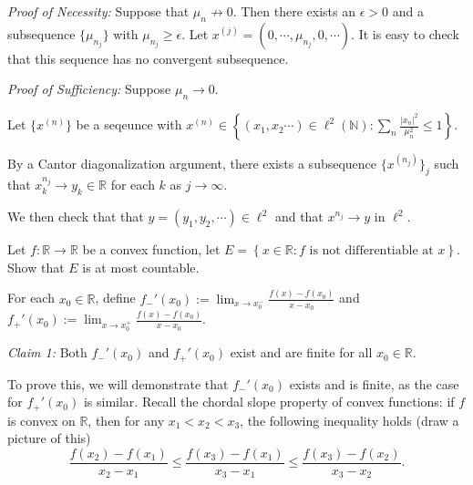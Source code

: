 \documentclass{exam}
\theoremstyle{problemstyle}
\newcommand{\vt}{\vskip 5mm} %
\newcommand{\1}[1]{\textbf{1}_{\left[#1\right]}} %
\def\R{\mathbb{R}} %
\begin{document}
\begin{questions}
\begin{parts}
\begin{solution}
\vt
\textit{Proof of Necessity:} Suppose that $\mu_n\not\to 0$. Then there exists an $\epsilon>0$ and a subsequence $\{\mu_{n_j}\}$ with $\mu_{n_j}\geq \epsilon$.
Let $x^{(j)} = (0,\cdots,\mu_{n_j},0,\cdots)$. It is easy to check that this sequence has no convergent subsequence.

\vt
\textit{Proof of Sufficiency:} Suppose $\mu_n\to 0$. 


Let $\{x^{(n)}\}$ be a seqeunce with $x^{(n)}\in \left\{ (x_{1},x_{2}\cdots) \in \ell^{2}(\mathbb{N}): \sum_{n}\frac{|x_{n}|^{2}}{\mu_{n}^{2}}\leq 1\right\}$.

By a Cantor diagonalization argument, there exists a subsequence $\{x^{(n_j)}\}_j$ such that $x^{n_j}_k\to y_k\in \R$ for each $k$ as $j\to\infty$. 

We then check that that $y = (y_1,y_2,\cdots) \in \ell^2$ and that $x^{n_j}\to y$ in $\ell^2$.

\end{solution}
\end{parts}


\question Let $f:\R\to\R$ be a convex function, let $E=\left\{ x\in \R : f \text{ is not differentiable at }x\right\}$. Show that $E$ is at most countable.


\begin{solution}
For each $x_{0}\in \R$, define $f_{-}'(x_{0}) := \lim_{x\to x_{0}^{-}} \frac{f(x)-f(x_{0})}{x-x_{0}}$ and $f_{+}'(x_{0}) := \lim_{x\to x_{0}^{+}} \frac{f(x)-f(x_{0})}{x-x_{0}}$.

\vt
\textit{Claim 1:} Both $f_{-}'(x_{0})$ and $f_{+}'(x_{0})$ exist and are finite for all $x_{0}\in \R$. 


To prove this, we will demonstrate that $f_{-}'(x_{0})$ exists and is finite, as the case for $f_{+}'(x_{0})$ is similar. Recall the chordal slope property of convex functions: if $f$ is convex on $\R$, then for any $x_{1}<x_{2}<x_{3}$, the following inequality holds (draw a picture of this)
\begin{equation}\label{eq:chord-inequality}
  \frac{f(x_{2})-f(x_{1})}{x_{2}-x_{1}}\leq \frac{f(x_{3})-f(x_{1})}{x_{3}-x_{1}}\leq \frac{f(x_{3})-f(x_{2})}{x_{3}-x_{2}}.
\end{equation}


\end{solution}
\end{questions}
\end{document}
